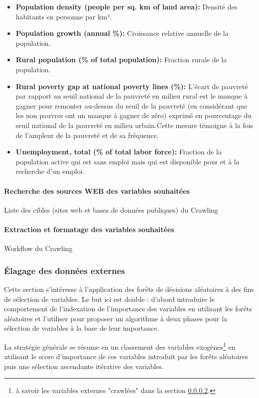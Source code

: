 \begin{itemize}
		\item \textbf{ Population density (people per sq. km of land area):} Densité des habitants en personne par km².
		\item \textbf{ Population growth (annual \%):} Croissance relative annuelle de la population.
		\item \textbf{ Rural population (\% of total population):} Fraction rurale de la population.
		\item \textbf{ Rural poverty gap at national poverty lines (\%):} L'écart de pauvreté par rapport au seuil national de la pauvreté en milieu rural est le manque à gagner pour remonter au-dessus du seuil de la pauvreté (en considérant que les non pauvres ont un manque à gagner de zéro) exprimé en pourcentage du seuil national de la pauvreté en milieu urbain.Cette mesure témoigne à la fois de l'ampleur de la pauvreté et de sa fréquence.
		\item \textbf{ Unemployment, total (\% of total labor force):} Fraction de la population active qui est sans emploi mais qui est disponible pour et à la recherche d'un emploi.
		\end{itemize}
	\paragraph{Recherche des sources WEB des variables souhaitées \newline}
	\par
	\begin{Huge}{ Liste des cibles (sites web et bases de données publiques) du Crawling }
		\end{Huge}
	\paragraph{Extraction et formatage des variables souhaitées \newline}\label{crawl}
	\par
	 \begin{Huge}{ Workflow du  Crawling }
	 		\end{Huge}
	\subsubsection{Élagage des données externes}
	Cette section s’intéresse à l'application des forêts de décisions aléatoires à des fins de sélection de variables. Le but ici est double : d'abord introduire le comportement de l'indexation de l'importance des variables en utilisant les forêts aléatoires et l'utiliser pour proposer un algorithme à deux phases pour la sélection de variables à la base de leur importance.\par
	La stratégie générale se résume en un classement des variables exogènes\footnote{à savoir les variables externes "crawlées" dans la section \ref{crawl}.} en utilisant le score d'importance de ces variables introduit par les forêts aléatoires puis une sélection ascendante itérative des variables.
